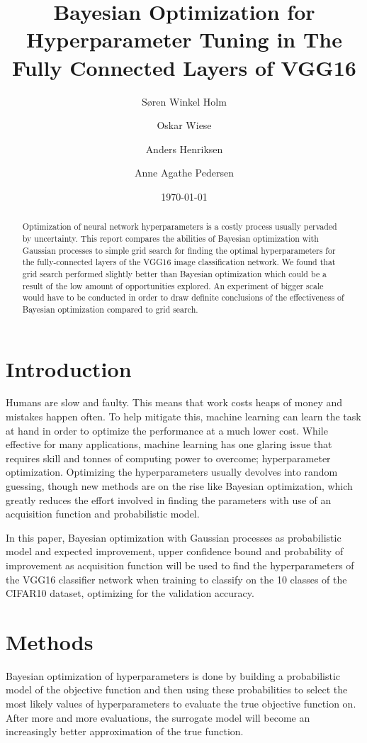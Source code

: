 \documentclass[12pt,fleqn]{article}
\title{Bayesian Optimization for Hyperparameter Tuning in The Fully Connected Layers of VGG16}
\author{Søren Winkel Holm\and Oskar Wiese\and Anders Henriksen\and Anne Agathe Pedersen}
\date{\today}
\begin{document}
\maketitle


\begin{abstract}
\noindent Optimization of neural network hyperparameters is a costly process usually pervaded by uncertainty. This report compares the abilities of Bayesian optimization with Gaussian processes to simple grid search for finding the optimal hyperparameters for the fully-connected layers of the VGG16 image classification network. We found that grid search performed slightly better than Bayesian optimization which could be a result of the low amount of opportunities explored. An experiment of bigger scale would have to be conducted in order to draw definite conclusions of the effectiveness of Bayesian optimization compared to grid search.

\end{abstract}


\section{Introduction} 
Humans are slow and faulty. This means that work costs heaps of money and mistakes happen often. To help mitigate this, machine learning can learn the task at hand in order to optimize the performance at a much lower cost. While effective for many applications, machine learning has one glaring issue that requires skill and tonnes of computing power to overcome; hyperparameter optimization. Optimizing the hyperparameters usually devolves into random guessing, though new methods are on the rise like Bayesian optimization, which greatly reduces the effort involved in finding the parameters with use of an acquisition function and probabilistic model.

In this paper, Bayesian optimization with Gaussian processes as probabilistic model and expected improvement, upper confidence bound and probability of improvement as acquisition function will be used to find the hyperparameters of the VGG16 classifier network when training to classify on the 10 classes of the CIFAR10 dataset, optimizing for the validation accuracy.


\section{Methods}
Bayesian optimization of hyperparameters is done by building a probabilistic model of the objective function and then using these probabilities to select the most likely values of hyperparameters to evaluate the true objective function on. After more and more evaluations, the surrogate model will become an increasingly better approximation of the true function. 
\end{document}
